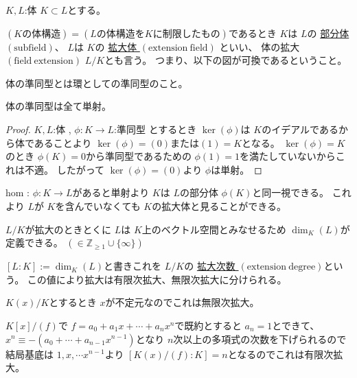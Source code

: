 \documentclass[../master_galois_theory]{subfiles}
\begin{document}
\begin{defi}
  $K , L$:体 $K \subset L$とする。

  $(Kの体構造) = (Lの体構造をKに制限したもの)$であるとき
  $K$は $L$の \underline{部分体 $(\mathrm{subfield})$}、
  $L$は $K$の \underline{拡大体 $(\mathrm{extension \  field})$}
  といい、
  体の拡大 $(\mathrm{field \  extension})$ $L/K$とも言う。
  つまり、以下の図が可換であるということ。


\end{defi}

\begin{defi}
  体の準同型とは環としての準同型のこと。
\end{defi}

\begin{note}
  体の準同型は全て単射。
\end{note}
\begin{proof}
  $K , L$:体 , $\phi : K \longrightarrow L$:準同型
  とするとき $\ker (\phi)$は $K$のイデアルであるから体であることより
  $\ker (\phi) = (0) または (1) = K$となる。
  $\ker (\phi) = K$のとき $\phi(K) = 0$から準同型であるための $\phi(1) = 1$を満たしていないからこれは不適。
  したがって $\ker (\phi) = (0)$より $\phi$は単射。
\end{proof}

  hom : $\phi : K \longrightarrow L$があると単射より $K$は $L$の部分体 $\phi(K)$と同一視できる。
  これより $L$が $K$を含んでいなくても $K$の拡大体と見ることができる。

  $L/K$が拡大のときとくに $L$は $K$上のベクトル空間とみなせるため $\dim_K(L)$が定義できる。 $(\in \mathbb{Z}_{\geq 1} \cup \{ \infty \})$

  \begin{defi}
    $[L:K] := \dim_K(L)$と書きこれを $L/K$の \underline{拡大次数 $(\mathrm{extension \  degree})$}という。
    この値により拡大は有限次拡大、無限次拡大に分けられる。
  \end{defi}

  \begin{exam}
    $K(x)/K$とするとき $x$が不定元なのでこれは無限次拡大。
    
    $K[x]/(f)$で $f = a_0 + a_1 x + \cdots + a_n x^n$で既約とすると
    $a_n = 1$とできて、 $x^n \equiv -(a_0 + \cdots + a_{n-1} x^{n-1})$となり
    $n$次以上の多項式の次数を下げられるので結局基底は $1 , x , \cdots x^{n-1}$より $[K(x)/(f) : K] = n$となるのでこれは有限次拡大。
  \end{exam}
\end{document}
